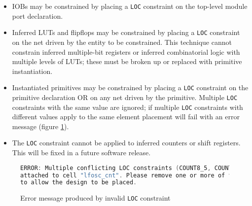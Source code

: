 \documentclass[11pt]{article}
\newcommand{\tokenstyle}[1]{\texttt{#1}}
\begin{document}
\begin{itemize}

\item IOBs may be constrained by placing a \tokenstyle{LOC} constraint on the top-level module port declaration.

\item Inferred LUTs and flipflops may be constrained by placing a \tokenstyle{LOC} constraint on the net driven by the
entity to be constrained. This technique cannot constrain inferred multiple-bit registers or inferred
combinatorial logic with multiple levels of LUTs; these must be broken up or replaced with primitive instantiation.

\item Instantiated primitives may be constrained by placing a \tokenstyle{LOC} constraint on the primitive declaration
OR on any net driven by the primitive. Multiple \tokenstyle{LOC} constraints with the same value are ignored; if
multiple \tokenstyle{LOC} constraints with different values apply to the same element placement will fail with an error
message (figure \ref{conflicting-loc}).

\item The \tokenstyle{LOC} constraint cannot be applied to inferred counters or shift registers. This will be fixed in
a future software release.

\end{itemize}

\begin{figure}[h]
\begin{lstlisting}[language=c]
ERROR: Multiple conflicting LOC constraints (COUNT8_5, COUNT8_4) are
attached to cell "lfosc_cnt". Please remove one or more of the constraints
to allow the design to be placed.
\end{lstlisting}
\caption{Error message produced by invalid \tokenstyle{LOC} constraint}
\label{conflicting-loc}
\end{figure}

\pagebreak
\end{document}
